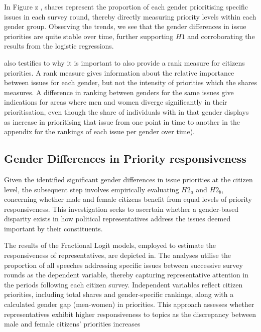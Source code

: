 In Figure z , shares represent the proportion of each gender prioritising specific issues in each survey round, thereby directly measuring priority levels within each gender group. Observing the trends, we see that the gender differences in issue priorities are quite stable over time, further supporting $H1$ and corroborating the results from the logistic regressions.

also testifies to why it is important to also provide a rank measure for citizens priorities. A rank measure gives information about the relative importance between issues for each gender, but not the intensity of priorities which the shares measures. A difference in ranking between genders for the same issues give indications for areas where men and women diverge significantly in their prioritisation, even though the share of individuals with in that gender displays as increase in prioritising that issue from one point in time to another in the appendix for the rankings of each issue per gender over time). 



\subsection*{Gender Differences in Priority responsiveness}
Given the identified significant gender differences in issue priorities at the citizen level, the subsequent step involves empirically evaluating $H2_{a}$ and $H2_{b}$, concerning whether male and female citizens benefit from equal levels of priority responsiveness. This investigation seeks to ascertain whether a gender-based disparity exists in how political representatives address the issues deemed important by their constituents.

The results of the Fractional Logit models, employed to estimate the responsiveness of representatives, are depicted in. The analyses utilise the proportion of all speeches addressing specific issues between successive survey rounds as the dependent variable, thereby capturing representative attention in the periods following each citizen survey. Independent variables reflect citizen priorities, including total shares and gender-specific rankings, along with a calculated gender gap (men-women) in priorities. This approach assesses whether representatives exhibit higher responsiveness to topics as the discrepancy between male and female citizens' priorities increases


